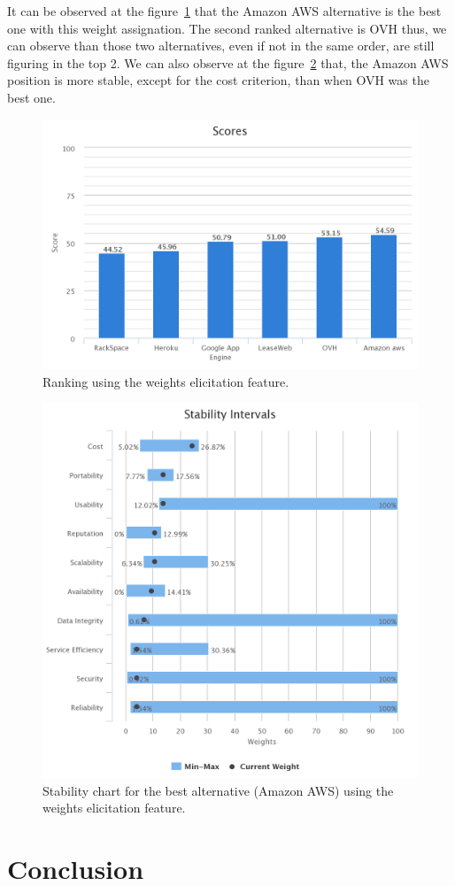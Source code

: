 \documentclass[a4paper,11pt]{article}
\begin{document}
It can be observed at the figure~\ref{fig:alt-ranking} that the Amazon AWS alternative is the best one with this weight assignation. The second ranked alternative is OVH thus, we can observe than those two alternatives, even if not in the same order, are still figuring in the top 2. We can also observe at the figure~\ref{fig:alt-stab} that, the Amazon AWS position is more stable, except for the cost criterion, than when OVH was the best one. 

\begin{figure}[h]
  \center
  \includegraphics[width=\textwidth-5cm]{img/Result/alternative_ranking.png}
  \caption{Ranking using the weights elicitation feature.}
  \label{fig:alt-ranking}
\end{figure}

\begin{figure}
  \centering
  \includegraphics[width=\textwidth-4cm]{img/Result/alternative_stability.png}
  \caption{Stability chart for the best alternative (Amazon AWS) using the weights elicitation feature.}
  \label{fig:alt-stab}
\end{figure}

\section{Conclusion}
\end{document}

